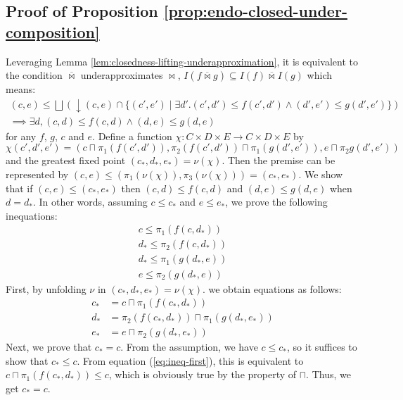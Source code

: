 \documentclass{llncs}
\newcommand{\bigjoin}{\bigsqcup}
\newcommand{\meet}{\sqcap}
\newcommand{\bowtielift}{\mathbin{\overline{\bowtie}}}
\begin{document}
\subsection{Proof of Proposition \ref{prop:endo-closed-under-composition}}
Leveraging Lemma \ref{lem:closedness-lifting-underapproximation}, it is equivalent to the condition $\bowtielift$ underapproximates $\bowtie$, $I(f \bowtielift g) \subseteq I(f) \bowtielift I(g)$ which means:
\begin{align*}
  (c, e) \leq \bigjoin (\downarrow (c , e) \cap \{(c', e') \mid \exists d'. (c' , d') \leq f (c' , d') \land (d' , e') \leq g (d' , e') \}) \\
  \implies \exists d , (c, d) \leq f (c , d) \land (d, e) \leq g (d, e)
\end{align*} for any $f$, $g$, $c$ and $e$.
Define a function $\chi : C \times D \times E \to C \times D \times E$ by
\[ \chi(c', d', e') = (c \meet \pi_{1} (f (c' ,d')) , \pi_{2} (f (c' , d')) \meet \pi_{1} (g (d' , e')) , e \meet \pi_{2} g (d' , e'))
\]
and the greatest fixed point $(c_{*} , d_{*} , e_{*}) = \nu(\chi)$.
Then the premise can be represented by $(c , e) \leq (\pi_{1}(\nu(\chi)) , \pi_{3}(\nu(\chi))) = (c_{*} , e_{*})$.
We show that if $(c , e) \leq (c_{*} , e_{*})$ then $(c, d) \leq f (c , d)$ and $(d, e) \leq g (d, e)$ when $d = d_{*}$. In other words, assuming $c \leq c_{*}$ and $e \leq e_{*}$, we prove the following inequations:
\begin{align}
  \label{enum:c} c \leq \pi_{1} (f (c , d_{*})) \\
  \label{enum:f} d_{*} \leq \pi_{2} (f (c , d_{*})) \\
  \label{enum:g} d_{*} \leq \pi_{1} (g (d_{*} , e)) \\
  \label{enum:e} e \leq \pi_{2} (g (d_{*} , e))
\end{align}
First, by unfolding $\nu$ in $(c_{*} , d_{*}, e_{*}) = \nu(\chi)$. we obtain equations as follows:
\begin{align}
c_{*} &= c \meet \pi_{1}( f (c_{*} , d_{*})) \label{eq:ineq-first}\\
d_{*} &= \pi_{2}(f (c_{*} , d_{*})) \meet \pi_{1}(g (d_{*} , e_{*})) \label{eq:ineq-second} \\
e_{*} &= e \meet \pi_{2}(g (d_{*} , e_{*})) \label{eq:ineq-third}
\end{align}
Next, we prove that $c_{*} = c$. From the assumption, we have $c \leq c_{*}$, so it suffices to show that $c_{*} \leq c$. From equation (\ref{eq:ineq-first}), this is equivalent to $c \meet \pi_{1}( f (c_{*} , d_{*})) \leq c$, which is obviously true by the property of $\meet$. Thus, we get $c_{*} = c$.
\end{document}
